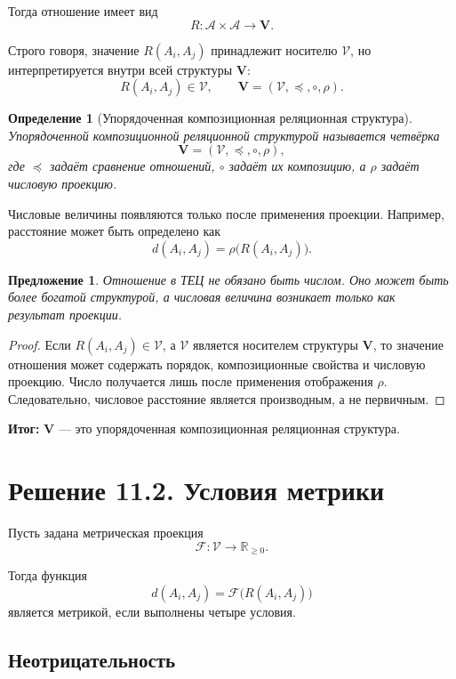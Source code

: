 \documentclass[12pt,a4paper]{article}
\newtheorem{definition}{Определение}[section]
\newtheorem{proposition}{Предложение}[section]
\newcommand{\Parts}{\mathcal A}
\newcommand{\Rel}{R}
\newcommand{\Values}{\mathcal V}
\newcommand{\Vstruct}{\mathbf V}
\newcommand{\Metric}{\mathcal F}
\begin{document}
Тогда отношение имеет вид
\[
\Rel:\Parts\times\Parts\to\Vstruct.
\]

Строго говоря, значение \(\Rel(A_i,A_j)\) принадлежит носителю \(\Values\), но интерпретируется внутри всей структуры \(\Vstruct\):
\[
\Rel(A_i,A_j)\in\Values,
\qquad
\Vstruct=(\Values,\preceq,\circ,\rho).
\]

\begin{definition}[Упорядоченная композиционная реляционная структура]
Упорядоченной композиционной реляционной структурой называется четвёрка
\[
\Vstruct=(\Values,\preceq,\circ,\rho),
\]
где \(\preceq\) задаёт сравнение отношений, \(\circ\) задаёт их композицию, а \(\rho\) задаёт числовую проекцию.
\end{definition}

Числовые величины появляются только после применения проекции. Например, расстояние может быть определено как
\[
d(A_i,A_j)=\rho\bigl(\Rel(A_i,A_j)\bigr).
\]

\begin{proposition}
Отношение в ТЕЦ не обязано быть числом. Оно может быть более богатой структурой, а числовая величина возникает только как результат проекции.
\end{proposition}

\begin{proof}
Если \(\Rel(A_i,A_j)\in\Values\), а \(\Values\) является носителем структуры \(\Vstruct\), то значение отношения может содержать порядок, композиционные свойства и числовую проекцию. Число получается лишь после применения отображения \(\rho\). Следовательно, числовое расстояние является производным, а не первичным.
\end{proof}

\textbf{Итог:} \(\Vstruct\) --- это упорядоченная композиционная реляционная структура.

\section{Решение 11.2. Условия метрики}

Пусть задана метрическая проекция
\[
\Metric:\Values\to\mathbb R_{\ge0}.
\]

Тогда функция
\[
d(A_i,A_j)=\Metric\bigl(\Rel(A_i,A_j)\bigr)
\]
является метрикой, если выполнены четыре условия.

\subsection{Неотрицательность}
\end{document}
